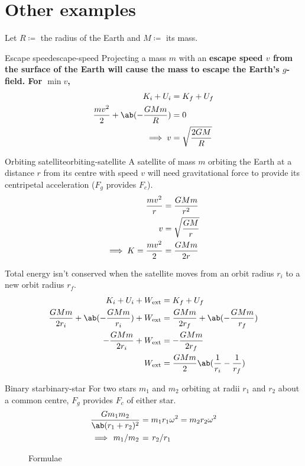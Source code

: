 \section{Other examples}
Let \(R \coloneq\) the radius of the Earth and \(M \coloneq\) its mass.
\begin{example}{Escape speed}{escape-speed}
	Projecting a mass \(m\) with an \bf{escape speed} \(v\) from the surface of the Earth
	will cause the mass to escape the Earth's \(g\)-field.
	For \(\min v\),
	\begin{align*}
		K_i + U_i                    & = K_f + U_f            \\
		\f{mv^2}{2}+\ab(-\f{GMm}{R}) & = 0                    \\
		\implies v                   & = \sqrt{\frac{2GM}{R}}
	\end{align*}
\end{example}

\begin{example}{Orbiting satellite}{orbiting-satellite}
	A satellite of mass \(m\) orbiting the Earth at a distance \(r\) from its centre
	with speed \(v\) will need gravitational force to provide its centripetal
	acceleration (\(F_g\) provides \(F_c\)).
	\begin{align*}
		\frac{mv^2}{r}              & = \frac{GMm}{r^2}     \\
		v                        & = \sqrt{\frac{GM}{r}} \\
		\implies K = \frac{mv^2}{2} & = \frac{GMm}{2r}
	\end{align*}

	Total energy isn't conserved when the satellite moves from
	an orbit radius \(r_i\) to a new orbit radius \(r_f\).
	\begin{align*}
		K_i + U_i + W_{\text{ext}}                          & = K_f + U_f                              \\
		\f{GMm}{2r_i} + \ab(-\f{GMm}{r_i}) + W_{\text{ext}} & = \f{GMm}{2r_f} + \ab(-\f{GMm}{r_f})     \\
		-\f{GMm}{2r_i} + W_{\text{ext}}                     & = -\f{GMm}{2r_f}                         \\
		W_{\text{ext}}                                      & = \f{GMm}{2}\ab(\f{1}{r_i} - \f{1}{r_f})
	\end{align*}
\end{example}

\begin{example}{Binary star}{binary-star}
	For two stars \(m_1\) and \(m_2\) orbiting at radii \(r_1\) and \(r_2\) about a common centre,
	\(F_g\) provides \(F_c\) of either star.
	\begin{align*}
		\f{Gm_1m_2}{\ab(r_1+r_2)^2} & = m_1r_1\omega^2 = m_2r_2\omega^2 \\
		\implies \lf{m_1}{m_2}      & = \lf{r_2}{r_1}
	\end{align*}
\end{example}

\begin{figure}[htpb]
	\centering
	
	\caption{Formulae}
	\label{fig:g-summary}
\end{figure}
